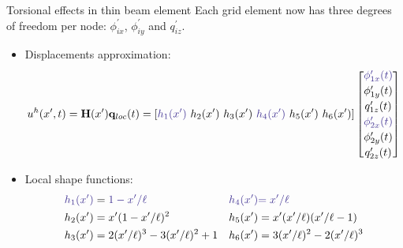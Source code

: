 \documentclass[aspectratio=169]{beamer}
\begin{document}
\begin{frame}{Torsional effects in thin beam element}
  Each grid element now has three degrees of freedom per node: $\phi_{ix}^\prime$, $\phi_{iy}^\prime$ and $q_{iz}^\prime$.

  \begin{itemize}
    \item Displacements approximation:
          $$u^h(x^\prime,t)=  \mathbf H(x^\prime)\mathbf q_{loc} (t)=[{\color{BlueViolet}h_1(x^\prime)}\ h_2(x^\prime)\  h_3(x^\prime)\ {\color{BlueViolet}h_4(x^\prime)}\  h_5(x^\prime)\ h_6(x^\prime)]\begin{bmatrix}
              {\color{BlueViolet} \phi_{1x}^\prime(t)} \\[2pt] \phi_{1y}^\prime(t) \\[2pt] q_{1z}^\prime(t)\\[2pt]  {\color{BlueViolet} \phi_{2x}^\prime(t)}\\[2pt] \phi_{2y}^\prime(t) \\[2pt]  q_{2z}^\prime(t)
            \end{bmatrix}$$
    \item Local shape functions:
          \begin{align*}
            {\color{BlueViolet}h_1(x^\prime)} & = {\color{BlueViolet}1-x^\prime/\ell}    & {\color{BlueViolet}h_4(x^\prime)} & {\color{BlueViolet}=x^\prime/\ell}        \\
            h_2(x^\prime)                     & =x^\prime(1-x^\prime/\ell)^2             & h_5(x^\prime)                     & =x^\prime(x^\prime/\ell)(x^\prime/\ell-1) \\
            h_3(x^\prime)                     & =2(x^\prime/\ell)^3-3(x^\prime/\ell)^2+1 & h_6(x^\prime)                     & =3(x^\prime/\ell)^2-2(x^\prime/\ell)^3    \\
          \end{align*}
  \end{itemize}
\end{frame}
\end{document}
